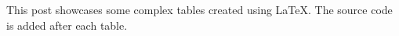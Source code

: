 This post showcases some complex tables created using LaTeX.  The source code is added after each table.

\newline